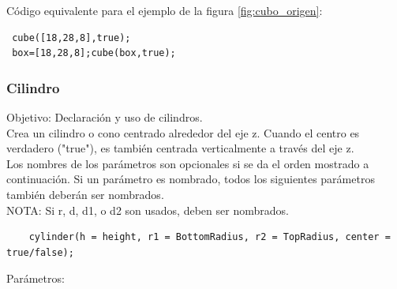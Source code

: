 \documentclass{article}
\begin{document}
Código equivalente para el ejemplo de la figura \ref{fig:cubo_origen}:\\

\begin{verbatim}
 cube([18,28,8],true);
 box=[18,28,8];cube(box,true);
\end{verbatim}

\subsubsection{Cilindro}

Objetivo: Declaración y uso de cilindros.\citep{OpenSCS}\\


Crea un cilindro o cono centrado alrededor del eje z. Cuando el centro es verdadero ("true"), es también centrada verticalmente a través del eje z.\citep{WikiOpensCAD}\\

Los nombres de los parámetros son opcionales si se da el orden mostrado a continuación. Si un parámetro es nombrado, todos los siguientes parámetros también deberán ser nombrados.\citep{WikiOpensCAD}\\

NOTA: Si r, d, d1, o d2 son usados, deben ser nombrados.\citep{WikiOpensCAD}\\

\begin{verbatim}
    cylinder(h = height, r1 = BottomRadius, r2 = TopRadius, center = true/false);
\end{verbatim}

Parámetros:\\
\end{document}
